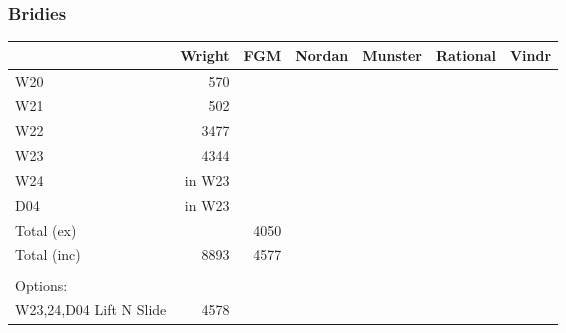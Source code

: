 \subsubsection{Bridies}
\begin{tabular}{|p{4cm}||r|r|r|r|r|r|}
\hline
&Wright & FGM &Nordan &Munster & Rational & Vindr
\\ \hline
W20 &570          
\\ \hline
W21 &502          
\\ \hline
W22 &3477          
\\ \hline
W23 &4344          
\\ \hline
W24 & in W23        
\\ \hline
D04 & in W23          
\\ \hline
Total (ex) & &4050       
\\ \hline
Total (inc)  & 8893 & 4577   
\\ \hline
\\ \hline
Options: 
\\ \hline
W23,24,D04 Lift N Slide  & 4578
\\ \hline
\end{tabular}
